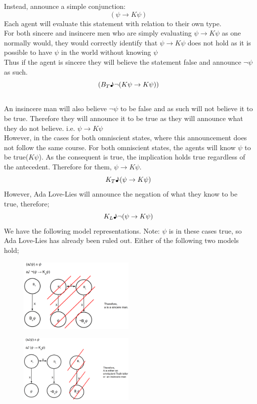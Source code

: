 \documentclass[12pt, titlepage, twoside, a4paper]{report}
\begin{document}
Instead, announce a simple conjunction:
$$(\psi \to K\psi)$$ 
Each agent will evaluate this statement with relation to their own type.\\
For both sincere and insincere men who are simply evaluating $\psi \to K\psi$ as one normally would, they would correctly identify that $\psi \to K\psi$ does not hold as it is possible to have $\psi$ in the world without knowing $\psi$\\
Thus if the agent is sincere they will believe the statement false and announce $\neg \psi$ as such. 
$$(B_T \text{\textmusicalnote} \neg (K \psi \to K \psi))$$ \\
An insincere man will also believe $\neg \psi$ to be false and as such will not believe it to be true. Therefore they will announce it to be true as they will announce what they do not believe. i.e. $\psi \to K\psi$\\
However, in the cases for both omniscient states, where this announcement does not follow the same course. For both omniscient states, the agents will know $\psi$ to be true($K\psi$). As the consequent is true, the implication holds true regardless of the antecedent. Therefore for them, $\psi \to K\psi$.
$$K_T\text{\textmusicalnote} (\psi \to K\psi)$$
However, Ada Love-Lies will announce the negation of what they know to be true, therefore;
$$K_L\text{\textmusicalnote} \neg (\psi \to K\psi)$$
We have the following model representations. Note: $\psi$ is in these cases true, so Ada Love-Lies has already been ruled out. Either of the following two models hold; 
\begin{figure}[h!]
  \centering
  \includegraphics[width=0.5\textwidth]{slide43.eps}
\end{figure}
\begin{figure}[h!]
  \centering
  \includegraphics[width=0.5\textwidth]{slide44.eps}
\end{figure}
\end{document}
